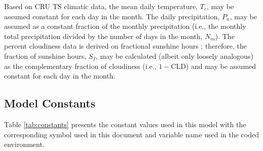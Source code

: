 Based on CRU TS climatic data, the mean daily temperature, $T_c$, may be assumed constant for each day in the month. 
The daily precipitation, $P_n$, may be assumed as a constant fraction of the monthly precipitation (i.e., the monthly total precipitation divided by the number of days in the month, $N_m$). 
The percent cloudiness data is derived on fractional sunshine hours \parencite{harris14}; therefore, the fraction of sunshine hours, $S_f$, may be calculated (albeit only loosely analogous) as the complementary fraction of cloudiness (i.e., $1-$CLD) and may be assumed constant for each day in the month.

\subsection{Model Constants}
\label{sec:constants}
Table \ref{tab:constants} presents the constant values used in this model with the corresponding symbol used in this document and variable name used in the coded environment. 

